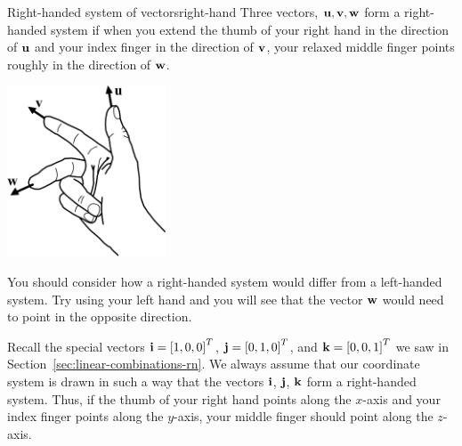 \begin{definition}{Right-handed system of vectors}{right-hand}
  Three vectors, $\mbox{\bf u},\mbox{\bf v},\mbox{\bf w}$ form a right-handed
  system if when you extend the thumb of your right hand in the
  direction of $\mbox{\bf u}$ and your index finger in the direction of
  $\mbox{\bf v}$, your relaxed middle finger points roughly in the
  direction of $\mbox{\bf w}$.
  \begin{center}
    \hspace{1in}
    \includegraphics[height=2in]{figures/right-handed}
  \end{center}
\end{definition}

You should consider how a right-handed system would differ from a
left-handed system. Try using your left hand and you will see that the
vector $\mbox{\bf w}$ would need to point in the opposite direction.

Recall the special vectors $\mbox{\bf i}=\left[1,0,0\right]^T$,
$\mbox{\bf j}=\left[0,1,0\right]^T$, and $\mbox{\bf k}=\left[0,0,1\right]^T$ we saw in
Section~\ref{sec:linear-combinations-rn}. We always assume that our
coordinate system is drawn in such a way that the vectors $\mbox{\bf i}$,
$\mbox{\bf j}$, $\mbox{\bf k}$ form a right-handed system. Thus, if the thumb
of your right hand points along the $x$-axis and your index finger
points along the $y$-axis, your middle finger should point along the
$z$-axis. 

\begin{center}
\end{center}

